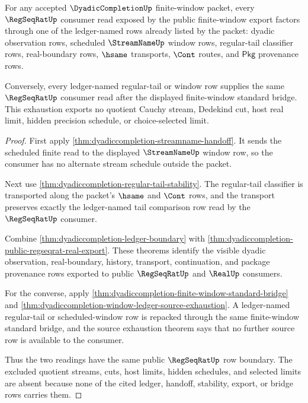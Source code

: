 \begin{theorem}
\label{thm:dyadiccompletion-regseqrat-window-exhaustion}
For any accepted $\DyadicCompletionUp$ finite-window packet, every
$\RegSeqRatUp$ consumer read exposed by the public finite-window export factors
through one of the ledger-named rows already listed by the packet: dyadic
observation rows, scheduled $\StreamNameUp$ window rows, regular-tail classifier
rows, real-boundary rows, $\hsame$ transports, $\Cont$ routes, and $\mathsf{Pkg}$
provenance rows.

Conversely, every ledger-named regular-tail or window row supplies the same
$\RegSeqRatUp$ consumer read after the displayed finite-window standard bridge.
This exhaustion exports no quotient Cauchy stream, Dedekind cut, host real
limit, hidden precision schedule, or choice-selected limit.
\end{theorem}
\begin{proof}
First apply \autoref{thm:dyadiccompletion-streamname-handoff}. It sends the
scheduled finite read to the displayed $\StreamNameUp$ window row, so the
consumer has no alternate stream schedule outside the packet.

Next use \autoref{thm:dyadiccompletion-regular-tail-stability}. The regular-tail
classifier is transported along the packet's $\hsame$ and $\Cont$ rows, and the
transport preserves exactly the ledger-named tail comparison row read by the
$\RegSeqRatUp$ consumer.

Combine \autoref{thm:dyadiccompletion-ledger-boundary} with
\autoref{thm:dyadiccompletion-public-regseqrat-real-export}. These theorems
identify the visible dyadic observation, real-boundary, history, transport,
continuation, and package provenance rows exported to public $\RegSeqRatUp$ and
$\RealUp$ consumers.

For the converse, apply
\autoref{thm:dyadiccompletion-finite-window-standard-bridge} and
\autoref{thm:dyadiccompletion-window-ledger-source-exhaustion}. A ledger-named
regular-tail or scheduled-window row is repacked through the same finite-window
standard bridge, and the source exhaustion theorem says that no further source
row is available to the consumer.

Thus the two readings have the same public $\RegSeqRatUp$ row boundary. The
excluded quotient streams, cuts, host limits, hidden schedules, and selected
limits are absent because none of the cited ledger, handoff, stability, export,
or bridge rows carries them.
\end{proof}

